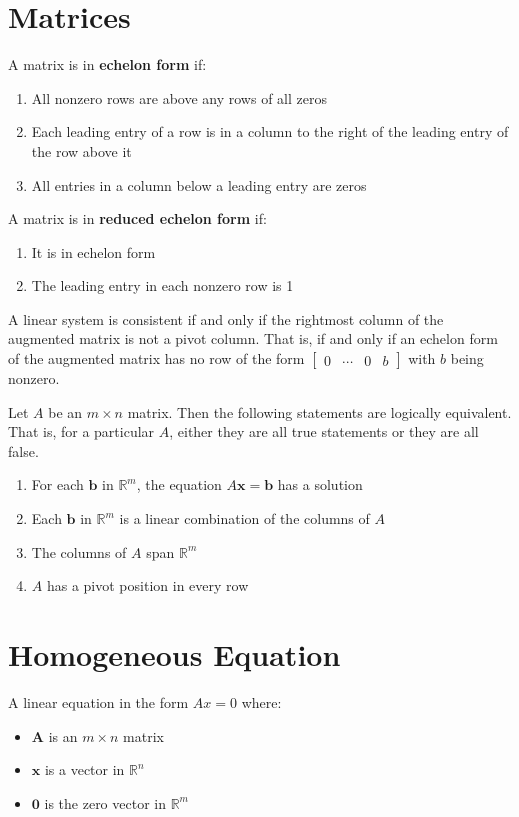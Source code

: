 \documentclass{article}
\begin{document}
\setlength{\parindent}{0pt}
\setlength{\parskip}{1em}
\section*{Matrices}

A matrix is in \textbf{echelon form} if:
\begin{enumerate}
    \item All nonzero rows are above any rows of all zeros
    \item Each leading entry of a row is in a column to the right of the leading entry of the row
    above it
    \item All entries in a column below a leading entry are zeros
\end{enumerate}

\noindent
A matrix is in \textbf{reduced echelon form} if:
\begin{enumerate}
    \item It is in echelon form
    \item The leading entry in each nonzero row is 1
\end{enumerate}

\noindent
A linear system is consistent if and only if the rightmost column of the augmented matrix is not a
pivot column. That is, if and only if an echelon form of the augmented matrix has no row of the
form $\begin{bmatrix} 0 & \cdots & 0 & b \end{bmatrix}$ with $b$ being nonzero.


Let $A$ be an $m \times n$ matrix. Then the following statements are logically equivalent. That is, for a particular $A$, either they are all true statements or they are all false.
\begin{enumerate}
    \item For each $\textbf{b}$ in $\mathbb{R}^m$, the equation $A\mathbf{x}=\mathbf{b}$ has a solution
    \item Each $\textbf{b}$ in $\mathbb{R}^m$ is a linear combination of the columns of $A$
    \item The columns of $A$ span $\mathbb{R}^m$
    \item $A$ has a pivot position in every row
\end{enumerate}

\section*{Homogeneous Equation}
A linear equation in the form $Ax=0$ where:
\begin{itemize}
    \item $\textbf{A}$ is an $m\times n$ matrix
    \item $\textbf{x}$ is a vector in $\mathbb{R}^n$
    \item $\textbf{0}$ is the zero vector in $\mathbb{R}^m$
\end{itemize}
\end{document}
